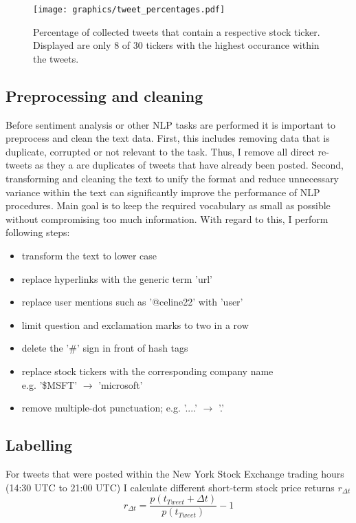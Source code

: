 \documentclass[a4paper,12pt]{article}%
\begin{document}
\begin{figure}
\captionsetup{justification=centering}
\centering
\texttt{[image: graphics/tweet\_percentages.pdf]}
\caption[Stock Ticker Occurance Histogram]{Percentage of collected tweets that contain a respective stock ticker. Displayed are only 8 of 30 tickers with the highest occurance within the tweets. \label{fig:tweet_percentages}}
\end{figure}

\subsection{Preprocessing and cleaning}
Before sentiment analysis or other NLP tasks are performed it is important to preprocess and clean the text data. First, this includes removing data that is duplicate, corrupted or not relevant to the task. Thus, I remove all direct re-tweets as they a are duplicates of tweets that have already been posted.
Second, transforming and cleaning the text to unify the format and reduce unnecessary variance within the text can significantly improve the performance of NLP procedures. Main goal is to keep the required vocabulary as small as possible without compromising too much information. With regard to this, I perform following steps:

\begin{itemize}
\item transform the text to lower case
\item replace hyperlinks with the generic term 'url'
\item replace user mentions such as '@celine22' with 'user'
\item limit question and exclamation marks to two in a row
\item delete the '\#' sign in front of hash tags
\item replace stock tickers with the corresponding company name \\ e.g. '\$MSFT' $\longrightarrow$ 'microsoft'
\item remove multiple-dot punctuation; e.g. '....' $\longrightarrow$ '.'
\end{itemize}


\subsection{Labelling \label{labelling}}
For tweets that were posted within the New York Stock Exchange trading hours (14:30 UTC to 21:00 UTC) I calculate different short-term stock price returns $r_{\Delta t}$
\begin{equation}
r_{\Delta t} = \frac{p(t_{Tweet} + \Delta t)}{p(t_{Tweet})} - 1
\end{equation}
\end{document}
